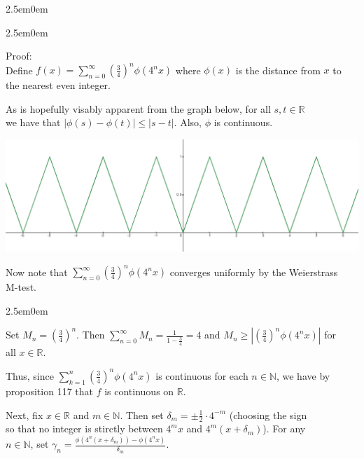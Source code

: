 \documentclass{book}
\newcommand{\hThree}{%
   \color{PineGreen!85!Orange}
   \fontsize{13}{15}\selectfont%
}
\newcommand{\hFour}{%
   \color{Cerulean}
   \fontsize{12}{14}\selectfont%
}
\newenvironment{myIndent}{%
   \begin{adjustwidth}{2.5em}{0em}%
}{%
   \end{adjustwidth}%
}
\newcommand{\retTwo}{\hfill\bigbreak}
\begin{document}
\begin{myIndent}
   {\begin{myIndent}\hThree
      Proof:\\ [-4pt]
      Define $f(x) = \sum\limits_{n=0}^\infty \left(\frac{3}{4}\right)^n \phi(4^n x)$ where $\phi(x)$ is the distance from $x$ to\\ [-8pt] \phantom{aaaaaaaaaaaaaaaaaaaaaaaaaaaaaaaaaaaaaaa} the nearest even integer.\retTwo

      As is hopefully visably apparent from the graph below, for all $s, t \in \mathbb{R}$\\ we have that $|\phi(s) - \phi(t)| \leq |s-t|$. Also, $\phi$ is continuous.
      \begin{center}
         \includegraphics[scale=0.50]{122_Image.png}
      \end{center}

      Now note that $\sum\limits_{n=0}^\infty \left(\frac{3}{4}\right)^n \phi(4^n x)$ converges uniformly by the Weierstrass\\ [-5pt] M-test.
      {\begin{myIndent}\hFour
         Set $M_n = \left(\frac{3}{4}\right)^n$. Then $\sum\limits_{n=0}^\infty M_n = \frac{1}{1 - \frac{3}{4}} = 4$ and $M_n \geq \left|\left(\frac{3}{4}\right)^n \phi(4^n x)\right|$ for\\ [-6pt] all $x \in \mathbb{R}$.\retTwo
      \end{myIndent}}

      Thus, since $\sum\limits_{k=1}^n\left(\frac{3}{4}\right)^n \phi(4^n x)$ is continuous for each $n \in \mathbb{N}$, we have by\\ [-7pt] \phantom{aaaaaaaaaaaaaaaaaaaaaaaaa} proposition 117 that $f$ is continuous on $\mathbb{R}$.\retTwo

      Next, fix $x \in \mathbb{R}$ and $m \in \mathbb{N}$. Then set $\delta_m = \pm \frac{1}{2} \cdot 4^{-m}$ (choosing the sign\\ [2pt] so that no integer is stirctly between $4^m x$ and $4^m(x + \delta_m)$). For any\\ $n \in \mathbb{N}$, set $\gamma_n = \frac{\phi(4^n(x + \delta_m)) - \phi(4^n x) }{\delta_m}$.\retTwo


\end{myIndent}}
\end{myIndent}
\end{document}
